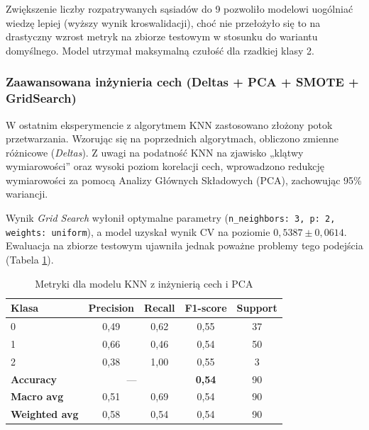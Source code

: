 \documentclass[12pt, a4paper]{article}
\begin{document}
Zwiększenie liczby rozpatrywanych sąsiadów do 9 pozwoliło modelowi uogólniać wiedzę lepiej (wyższy wynik kroswalidacji), choć nie przełożyło się to na drastyczny wzrost metryk na zbiorze testowym w stosunku do wariantu domyślnego. Model utrzymał maksymalną czułość dla rzadkiej klasy 2.

\subsubsection{Zaawansowana inżynieria cech (Deltas + PCA + SMOTE + GridSearch)}

W ostatnim eksperymencie z algorytmem KNN zastosowano złożony potok przetwarzania. Wzorując się na poprzednich algorytmach, obliczono zmienne różnicowe (\textit{Deltas}). Z uwagi na podatność KNN na zjawisko „klątwy wymiarowości” oraz wysoki poziom korelacji cech, wprowadzono redukcję wymiarowości za pomocą Analizy Głównych Składowych (PCA), zachowując 95\% wariancji.

Wynik \textit{Grid Search} wyłonił optymalne parametry (\texttt{n\_neighbors: 3, p: 2, weights: uniform}), a model uzyskał wynik CV na poziomie $0{,}5387 \pm 0{,}0614$. Ewaluacja na zbiorze testowym ujawniła jednak poważne problemy tego podejścia (Tabela \ref{tab:knn_adv_results}).

\begin{table}[H]
\centering
\caption{Metryki dla modelu KNN z inżynierią cech i PCA}
\label{tab:knn_adv_results}
\begin{tabular}{@{}lcccc@{}}
\toprule
\textbf{Klasa} & \textbf{Precision} & \textbf{Recall} & \textbf{F1-score} & \textbf{Support} \\ \midrule
0              & 0,49               & 0,62            & 0,55              & 37               \\
1              & 0,66               & 0,46            & 0,54              & 50               \\
2              & 0,38               & 1,00            & 0,55              & 3                \\ \midrule
\textbf{Accuracy}       & \multicolumn{2}{c}{---}       & \textbf{0,54}     & 90               \\
\textbf{Macro avg}      & 0,51               & 0,69            & 0,54              & 90               \\
\textbf{Weighted avg}   & 0,58               & 0,54            & 0,54              & 90               \\ \bottomrule
\end{tabular}
\end{table}
\end{document}

